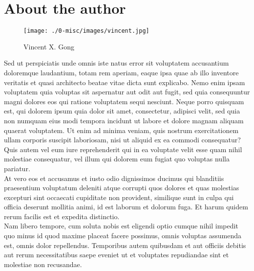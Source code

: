 \chapter*{About the author}


\begin{wrapfigure}{O}{0.34\textwidth}
\texttt{[image: ./0-misc/images/vincent.jpg]}\par
\caption{\label{fig:frog2}Vincent X. Gong}
\end{wrapfigure}

Sed ut perspiciatis unde omnis iste natus error sit voluptatem accusantium doloremque laudantium, totam rem aperiam, eaque ipsa quae ab illo inventore veritatis et quasi architecto beatae vitae dicta sunt explicabo. Nemo enim ipsam voluptatem quia voluptas sit aspernatur aut odit aut fugit, sed quia consequuntur magni dolores eos qui ratione voluptatem sequi nesciunt. Neque porro quisquam est, qui dolorem ipsum quia dolor sit amet, consectetur, adipisci velit, sed quia non numquam eius modi tempora incidunt ut labore et dolore magnam aliquam quaerat voluptatem. Ut enim ad minima veniam, quis nostrum exercitationem ullam corporis suscipit laboriosam, nisi ut aliquid ex ea commodi consequatur? Quis autem vel eum iure reprehenderit qui in ea voluptate velit esse quam nihil molestiae consequatur, vel illum qui dolorem eum fugiat quo voluptas nulla pariatur.\\

At vero eos et accusamus et iusto odio dignissimos ducimus qui blanditiis praesentium voluptatum deleniti atque corrupti quos dolores et quas molestias excepturi sint occaecati cupiditate non provident, similique sunt in culpa qui officia deserunt mollitia animi, id est laborum et dolorum fuga. Et harum quidem rerum facilis est et expedita distinctio.\\


Nam libero tempore, cum soluta nobis est eligendi optio cumque nihil impedit quo minus id quod maxime placeat facere possimus, omnis voluptas assumenda est, omnis dolor repellendus. Temporibus autem quibusdam et aut officiis debitis aut rerum necessitatibus saepe eveniet ut et voluptates repudiandae sint et molestiae non recusandae.


\vspace*{\fill}
\pagebreak

\vspace*{0.60cm}


